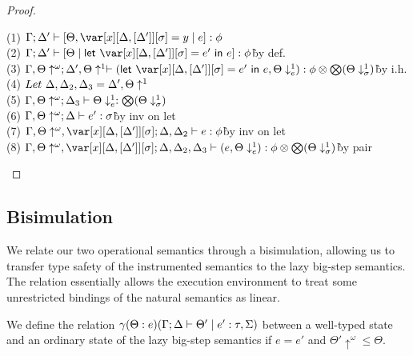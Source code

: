 \documentclass[acmsmall,review,screen]{acmart}
\newcommand{\llet}[2]{\mathsf{let}~#1~\mathsf{in}~#2}
\begin{document}
\begin{proof}
\begin{description}
\begin{tabbing}
    (1) $\G; \D' \vdash \left[ \Theta, \xD = y \mid e \right] : \phi$\\
    (2) $\G; \D' \vdash \left[ \Theta \mid \llet{\xD = e'}{e} \right] : \phi$\` by def.\\
    (3) $\G, \Theta\uparrow^\omega; \D', \Theta\uparrow^1 \vdash (\llet{\xD = e'}{e}, \Theta\downarrow^1_e) : \phi \otimes \bigotimes(\Theta\downarrow^1_\sigma)$\` by i.h.\\
    (4) $Let~\Delta,\Delta_2,\Delta_3 = \Delta', \Theta\uparrow^1 $\\
    (5) $\Gamma, \Theta\uparrow^\omega; \Delta_3 \vdash \Theta\downarrow^1_e : \bigotimes(\Theta\downarrow^1_\sigma)$\\
    (6) $\Gamma, \Theta\uparrow^\omega; \Delta \vdash e' : \sigma$\` by inv on let\\
    (7) $\G, \Theta\uparrow^\omega, \xD; \D,\D_2 \vdash e : \phi $\` by inv on let\\
    (8) $\G, \Theta\uparrow^\omega, \xD; \D,\D_2,\D_3 \vdash (e, \Theta\downarrow^1_e) : \phi \otimes \bigotimes(\Theta\downarrow^1_\sigma)$\` by pair\\
\end{tabbing}
\end{description}
\end{proof}


\subsection{Bisimulation}


We relate our two operational semantics through a bisimulation,
allowing us to transfer type safety of the instrumented semantics to
the lazy big-step semantics. The relation essentially allows the
execution environment to treat some unrestricted bindings
of the natural semantics as linear.

\begin{definition}[Bisimulation]
We define the relation $\gamma(\Theta : e)(\Gamma ; \Delta \vdash \Theta' \mid
e' : \tau,\Sigma)$ between a well-typed state and an ordinary state of
the lazy big-step semantics if $e = e'$ and $\Theta'{\uparrow^\omega}
\leq \Theta$.
\end{definition}
\end{document}
